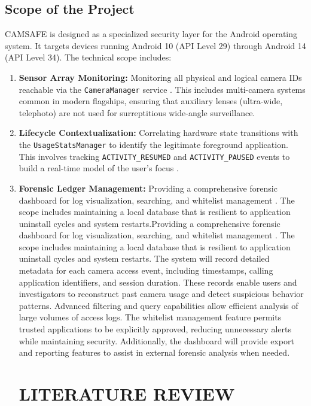 \documentclass[12pt,a4paper]{report}
\begin{document}
    \section{Scope of the Project}
    CAMSAFE is designed as a specialized security layer for the Android operating system. It targets devices running Android 10 (API Level 29) through Android 14 (API Level 34). The technical scope includes:
    \begin{enumerate}
        \item \textbf{Sensor Array Monitoring:} Monitoring all physical and logical camera IDs reachable via the \texttt{CameraManager} service \cite{androidhal}. This includes multi-camera systems common in modern flagships, ensuring that auxiliary lenses (ultra-wide, telephoto) are not used for surreptitious wide-angle surveillance.
        \item \textbf{Lifecycle Contextualization:} Correlating hardware state transitions with the \texttt{UsageStatsManager} to identify the legitimate foreground application. This involves tracking \texttt{ACTIVITY\_RESUMED} and \texttt{ACTIVITY\_PAUSED} events to build a real-time model of the user's focus \cite{contextaware}.
        \item \textbf{Forensic Ledger Management:} Providing a comprehensive forensic dashboard for log visualization, searching, and whitelist management \cite{smarthome}. The scope includes maintaining a local database that is resilient to application uninstall cycles and system restarts.Providing a comprehensive forensic dashboard for log visualization, searching, and whitelist management \cite{smarthome}. The scope includes maintaining a local database that is resilient to application uninstall cycles and system restarts. The system will record detailed metadata for each camera access event, including timestamps, calling application identifiers, and session duration. These records enable users and investigators to reconstruct past camera usage and detect suspicious behavior patterns. Advanced filtering and query capabilities allow efficient analysis of large volumes of access logs. The whitelist management feature permits trusted applications to be explicitly approved, reducing unnecessary alerts while maintaining security. Additionally, the dashboard will provide export and reporting features to assist in external forensic analysis when needed.

   

       \chapter{LITERATURE REVIEW}


\end{enumerate}
\end{document}
